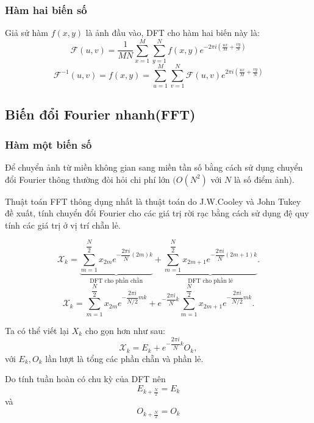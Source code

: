 \documentclass[12pt,a4paper]{report}
\numberwithin{equation}{section}
\theoremstyle{definition} %
\begin{document}
\subsubsection{Hàm hai biến số}
Giả sử hàm $f(x,y)$ là ảnh đầu vào, DFT cho hàm hai biến này là: 
\begin{equation}
\mathcal{F}(u,v) = \dfrac{1}{MN}\sum_{x=1}^{M}\sum_{y=1}^{N} f(x,y)e^{-2\pi i\left(\frac{ux}{M}+\frac{vy}{N}\right)}
\end{equation}
\begin{equation}
\mathcal{F}^{-1}(u,v)=f(x,y) =\sum_{u=1}^{M}\sum_{v=1}^{N} \mathcal{F}(u,v)e^{2\pi i\left(\frac{ux}{M}+\frac{vy}{N}\right)}
\end{equation}
\subsection{Biến đổi Fourier nhanh(FFT)}
\subsubsection{Hàm một biến số}
Để chuyển ảnh từ miền không gian sang miền tần số bằng cách sử dụng chuyển đổi Fourier thông thường đòi hỏi chi phí lớn $(O(N^2)$ với $N$ là số điểm ảnh).

Thuật toán FFT thông dụng nhất là thuật toán do J.W.Cooley và John Tukey đề xuất, tính chuyển đổi Fourier cho các giá trị rời rạc bằng cách sử dụng đệ quy tính các giá trị ở vị trí chẵn lẻ. 


\begin{equation}
	\label{1314}
\mathcal{X}_k = \underbrace{\sum_{m=1}^{\dfrac{N}{2}}x_{2m}e^{-\dfrac{2\pi i}{N}(2m)k}}_{ \text{DFT cho phần chẵn}} + \underbrace{\sum_{m=1}^{\dfrac{N}{2}}x_{2m+1}e^{-\dfrac{2\pi i}{N}(2m+1)k}}_{\text{DFT cho phần lẻ}}.
\end{equation}
\begin{equation}
	\label{1315}
\mathcal{X}_k = \sum_{m=1}^{\dfrac{N}{2}}x_{2m}e^{-\dfrac{2\pi i}{N/2}mk} + e^{-\dfrac{2\pi i }{N}k}\sum_{m=1}^{\dfrac{N}{2}}x_{2m+1}e^{-\dfrac{2\pi i}{N/2}mk}.
\end{equation}

Ta có thể viết lại $X_k$ cho gọn hơn như sau: 
\begin{equation}
	\label{1316}
\mathcal{X}_k = E_k + e^{-\dfrac{2\pi i }{N}k}O_k,
\end{equation}
với $E_k, O_k$ lần lượt là tổng các phần chẵn và phần lẻ.

Do tính tuần hoàn có chu kỳ của DFT nên
\begin{equation}
    E_{k+\tfrac{N}{2}} = E_k
\end{equation}
và
\begin{equation}
    O_{k+\tfrac{N}{2}} = O_k
\end{equation}
\end{document}
